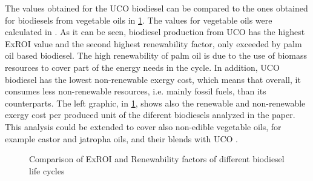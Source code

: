 \documentclass[sustainability,article,submit,moreauthors,pdftex,12pt,a4paper]{mdpi}
\begin{document}
The values obtained for the UCO biodiesel can be compared to the ones obtained for biodiesels from vegetable oils in \cref{fig3}.  The values for vegetable oils were calculated in \cite{FontdeMoraThesis2013}. As it can be seen, biodiesel production from UCO has the highest ExROI value and the second highest renewability factor, only exceeded by palm oil based biodiesel. The high renewability of palm oil is due to the use of biomass resources to cover part of the energy needs in the cycle. In addition, UCO biodiesel has the lowest non-renewable exergy cost, which means that overall, it consumes less non-renewable resources, i.e. mainly fossil fuels, than its counterparts. The left graphic, in \cref{fig3}, shows also the renewable and non-renewable exergy cost per produced unit of the diferent biodiesels analyzed in the paper. This analysis could be extended to cover also non-edible vegetable oils, for example castor and jatropha oils, and their blends with UCO \cite{Kannan2013}.

\begin{figure}[htbp]
\centering
{}
\hfill
{}
\caption{Comparison of ExROI and Renewability factors of different biodiesel life cycles}
\label{fig3}
\end{figure}
\end{document}
